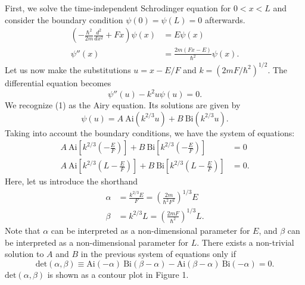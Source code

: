 \documentclass[12pt]{article}
\begin{document}
First, we solve the time-independent Schrodinger equation for $0 < x < L$ and consider the boundary condition $\psi(0) = \psi(L) = 0$ afterwards.
\begin{align*}
	\left( -\frac{\hbar^2}{2m}\frac{\textit{d}^2}{\textit{d}x ^2} + Fx \right)\psi(x) &= E\psi(x) \\
	\psi ''(x) &= \frac{2m(Fx-E)}{\hbar^2} \psi(x).
\end{align*}
Let us now make the substitutions $u = x - E/F$ and $k = (2mF/\hbar^2)^{1/2}$.  The differential equation becomes
\begin{equation}
	\psi ''(u) - k^2 u \psi(u) = 0.
\end{equation}
We recognize (1) as the Airy equation.  Its solutions are given by 
\begin{equation}
	\psi(u) = A \ \text{Ai}(k^{2/3}u) + B \ \text{Bi}(k^{2/3}u).
\end{equation}
Taking into account the boundary conditions, we have the system of equations:
\begin{align*}
	A \ \text{Ai}\left[ k^{2/3}\left( -\frac{E}{F} \right) \right] + B \ \text{Bi}\left[ k^{2/3}\left(- \frac{E}{F} \right) \right] &= 0 \\
	A \ \text{Ai}\left[ k^{2/3}\left( L-\frac{E}{F} \right) \right] + B \ \text{Bi}\left[ k^{2/3} \left( L - \frac{E}{F} \right) \right] &= 0.
\end{align*}
Here, let us introduce the shorthand
\begin{align*}
	\alpha &= \frac{k^{2/3}E}{F} = \left( \frac{2m}{\hbar^2 F^2} \right)^{1/3} E \\
	\beta &= k^{2/3} L = \left( \frac{2mF}{\hbar^2} \right)^{1/3} L.
\end{align*}
Note that $\alpha$ can be interpreted as a non-dimensional parameter for $E$, and $\beta$ can be interpreted as a non-dimensional parameter for $L$.  There exists a non-trivial solution to $A$ and $B$ in the previous system of equations only if
\begin{equation}
	\text{det}(\alpha, \beta) \equiv \text{Ai}(-\alpha) \ \text{Bi}(\beta - \alpha) - \text{Ai}(\beta - \alpha)\ \text{Bi}(-\alpha) = 0.
\end{equation}
$\text{det}(\alpha,\beta)$ is shown as a contour plot in Figure 1.  
\end{document}
